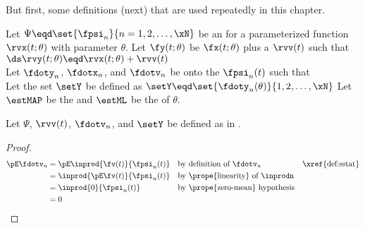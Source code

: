 But first, some definitions (next) that are used repeatedly in this chapter.
\begin{definition}
\label{def:sstat}
Let $\Psi\eqd\set{\fpsi_n}{n=1,2,\ldots,\xN}$ be an  
for a parameterized function $\rvx(t;\theta)$ with parameter $\theta$.
Let $\fy(t;\theta)$ be $\fx(t;\theta)$ plus a  $\rvv(t)$ such that 
\\\indentx$\ds
  \rvy(t;\theta)\eqd\rvx(t;\theta)+\rvv(t)
$\\
Let $\fdoty_n$, $\fdotx_n$, and $\fdotv_n$ be 
onto the  $\fpsi_n(t)$ such that 
\\
Let the set $\setY$ be defined as $\setY\eqd\set{\fdoty_n(\theta)}{1,2,\ldots,\xN}$ 
Let $\estMAP$ be the  
and $\estML$  be the   of $\theta$.
\end{definition}

\begin{lemma}
\label{lem:fdotv_pE}
Let $\Psi$, $\rvv(t)$, $\fdotv_n$, and $\setY$ be defined as in .
\end{lemma}
\begin{proof}
\begin{align*}
  \pE\fdotv_{n}
    &= \pE\inprod{\fv(t)}{\fpsi_n(t)}
    && \text{by definition of $\fdotv_n$}
    && \text{\xref{def:sstat}}
  \\&= \inprod{\pE\fv(t)}{\fpsi_n(t)}
    && \text{by \prope{linearity} of $\inprodn$}
  \\&= \inprod{0}{\fpsi_n(t)}
    && \text{by \prope{zero-mean} hypothesis}
  \\&= 0
\end{align*}
\end{proof}

